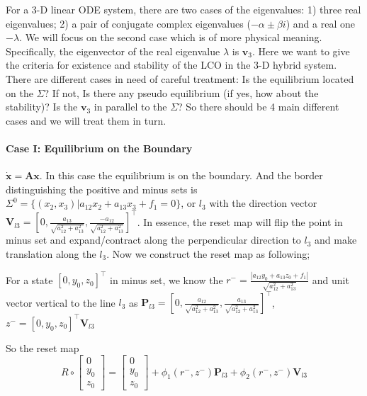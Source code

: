 \documentclass[a4paper,10pt]{article}
\begin{document}
	For a 3-D linear ODE system, there are two cases of the eigenvalues: 1) three real eigenvalues; 2) a pair of conjugate complex eigenvalues ($-\alpha \pm \beta i$) and a real one $-\lambda$. We will focus on the second case which is of more physical meaning. Specifically, the eigenvector of the real eigenvalue $\lambda$ is $\mathbf{v}_3$. Here we want to give the criteria for existence and stability of the LCO in the 3-D hybrid system. There are different cases in need of careful treatment: Is the equilibrium located on the $\Sigma$? If not, Is there any pseudo equilibrium (if yes, how about the stability)? Is the $\mathbf{v}_3 $ in parallel to the $\Sigma$? So there should be 4 main different cases and we will treat them in turn.
	
	\paragraph{Case I: Equilibrium on the Boundary}
	$\dot{\mathbf{x}} =\mathbf{A}\mathbf{x}$. In this case the equilibrium is on the boundary. And the border distinguishing the positive and minus sets is $\Sigma^0 = \{(x_2,x_3)|a_{12}x_2+ a_{13}x_3+f_1=0\}$, or $l_3$ with the direction vector $\mathbf{V}_{l3} = [0,\frac{a_{13}}{\sqrt{a_{12}^2+a_{13}^2}},\frac{-a_{12}}{\sqrt{a_{12}^2+a_{13}^2}}]^{\top} $. %
	In essence, the reset map will flip the point in minus set and expand/contract along the perpendicular direction to $l_3$ and make translation along the $l_3$. Now we construct the reset map as following;
	
	For a state $[0,y_0,z_0]^{\top}$ in minus set, we know the $r^- = \frac{|a_{12}y_0+a_{13}z_0+f_1|}{\sqrt{a_{12}^2+a_{13}^2}}$ and  unit vector vertical to the line $l_3$ as $\mathbf{P}_{l3} = [0,\frac{a_{12}}{\sqrt{a_{12}^2+a_{13}^2}},\frac{a_{13}}{\sqrt{a_{12}^2+a_{13}^2}}]^{\top}$, $z^- = [0,y_0,z_0]^{\top} \mathbf{V}_{l3} $
	
	So the reset map 
	$$R \circ
	\begin{bmatrix}
	0\\y_0\\z_0
	\end{bmatrix} = 
	\begin{bmatrix}
	0\\y_0\\z_0
	\end{bmatrix} + \phi_1(r^-,z^-) \mathbf{P}_{l3}+\phi_2(r^-,z^-) \mathbf{V}_{l3}
	$$
	
\end{document}
